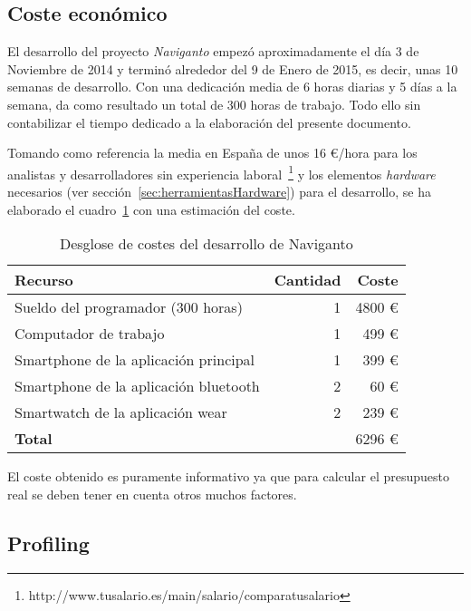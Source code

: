 \subsection{Coste económico}

El desarrollo del proyecto \emph{Naviganto} empezó aproximadamente el día 3 de Noviembre de 2014 y
terminó alrededor del 9 de Enero de 2015, es decir, unas 10 semanas de desarrollo. Con una
dedicación media de 6 horas diarias y 5 días a la semana, da como resultado un total de 300 horas de
trabajo. Todo ello sin contabilizar el tiempo dedicado a la elaboración del presente documento.

Tomando como referencia la media en España de unos 16 \euro/hora para los analistas y
desarrolladores sin experiencia
laboral~\footnote{http://www.tusalario.es/main/salario/comparatusalario} y los elementos
\emph{hardware} necesarios (ver sección~\ref{sec:herramientasHardware}) para el desarrollo, se ha
elaborado el cuadro~\ref{cuadro:costes} con una estimación del coste.

\begin{table}[h]
  \centering
  \begin{tabular}{|l|r|r|}
    \hline
    \textbf{Recurso} & \textbf{Cantidad} & \textbf{Coste} \\
    \hline
    Sueldo del programador (300 horas)     & 1 & 4800 \euro \\
    \hline
    Computador de trabajo                  & 1 &  499 \euro \\
    \hline
    Smartphone de la aplicación principal  & 1 &  399 \euro \\
    \hline
    Smartphone de la aplicación bluetooth  & 2 &   60 \euro \\
    \hline
    Smartwatch de la aplicación wear       & 2 &  239 \euro \\
    \hline
    \textbf{Total}                         &   & 6296 \euro \\
    \hline
  \end{tabular}
  \caption{Desglose de costes del desarrollo de Naviganto}
  \label{cuadro:costes}
\end{table}

El coste obtenido es puramente informativo ya que para calcular el presupuesto real se deben tener
en cuenta otros muchos factores.

\subsection{Profiling}

